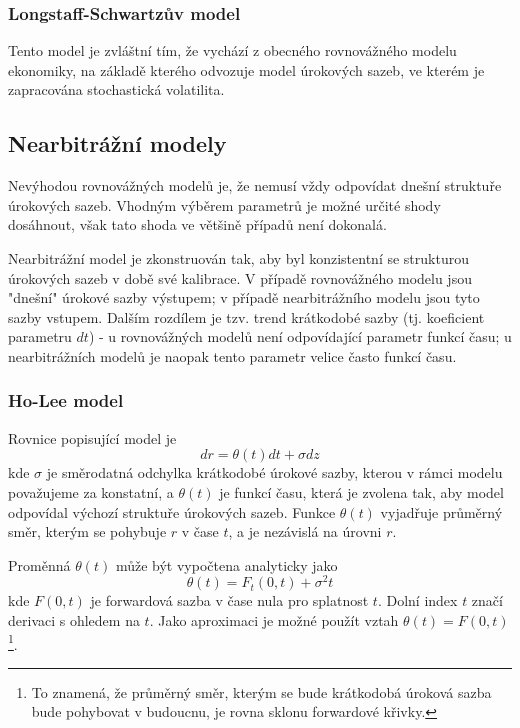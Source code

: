 \documentclass[a4paper]{book}
\begin{document}
\subsubsection{Longstaff-Schwartzův model}

Tento model je zvláštní tím, že vychází z obecného rovnovážného modelu ekonomiky, na základě kterého odvozuje model úrokových sazeb, ve kterém je zapracována stochastická volatilita.

\subsection{Nearbitrážní modely}

Nevýhodou rovnovážných modelů je, že nemusí vždy odpovídat dnešní struktuře úrokových sazeb. Vhodným výběrem parametrů je možné určité shody dosáhnout, však tato shoda ve většině případů není dokonalá.

Nearbitrážní model je zkonstruován tak, aby byl konzistentní se strukturou úrokových sazeb v době své kalibrace. V případě rovnovážného modelu jsou "dnešní" úrokové sazby výstupem; v případě nearbitrážního modelu jsou tyto sazby vstupem. Dalším rozdílem je tzv. trend krátkodobé sazby (tj. koeficient parametru $dt$) - u rovnovážných modelů není odpovídající parametr funkcí času; u nearbitrážních modelů je naopak tento parametr velice často funkcí času.

\subsubsection{Ho-Lee model}

Rovnice popisující model je
\begin{equation*}
dr = \theta (t) dt + \sigma dz
\end{equation*}
kde $\sigma$ je směrodatná odchylka krátkodobé úrokové sazby, kterou v rámci modelu považujeme za konstatní, a $\theta (t)$ je funkcí času, která je zvolena tak, aby model odpovídal výchozí struktuře úrokových sazeb. Funkce $\theta (t)$ vyjadřuje průměrný směr, kterým se pohybuje $r$ v čase $t$, a je nezávislá na úrovni $r$.

Proměnná $\theta (t)$ může být vypočtena analyticky jako
\begin{equation*}
\theta (t) = F_t(0,t)+\sigma^2 t
\end{equation*}
kde $F(0,t)$ je forwardová sazba v čase nula pro splatnost $t$. Dolní index $t$ značí derivaci s ohledem na $t$. Jako aproximaci je možné použít vztah $\theta (t) = F(0,t)$\footnote{To znamená, že průměrný směr, kterým se bude krátkodobá úroková sazba bude pohybovat v budoucnu, je rovna sklonu forwardové křivky.}.
\end{document}
